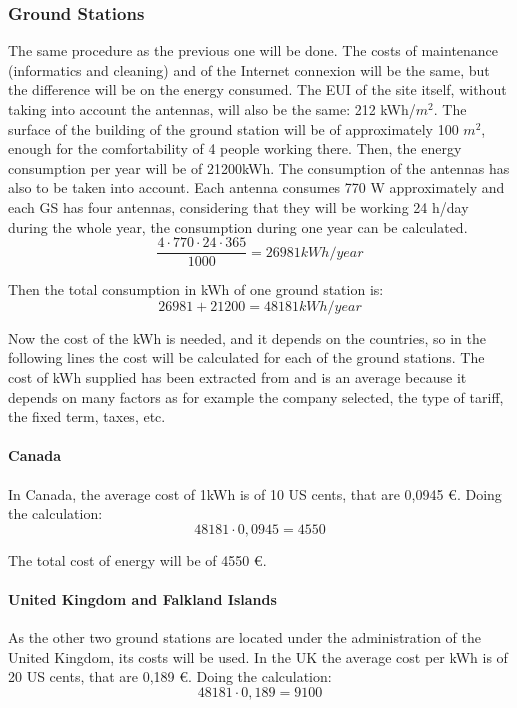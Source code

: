 \subsubsection{Ground Stations}
The same procedure as the previous one will be done. The costs of maintenance (informatics and cleaning) and of the Internet connexion will be the same, but the difference will be on the energy consumed. The EUI of the site itself, without taking into account the antennas, will also be the same: 212 kWh/$m^2$. The surface of the building of the ground station will be of approximately 100 $m^2$, enough for the comfortability of 4 people working there. Then, the energy consumption per year will be of 21200kWh. The consumption of the antennas has also to be taken into account. Each antenna consumes 770 W approximately and each GS has four antennas, considering that they will be working 24 h/day during the whole year, the consumption during one year can be calculated.
\begin{equation}
\frac{4 \cdot 770 \cdot 24 \cdot 365}{1000}=26981 kWh/year 
\end{equation}

Then the total consumption in kWh of one ground station is:
\begin{equation}
26981+21200=48181 kWh/year
\end{equation}

Now the cost of the kWh is needed, and it depends on the countries, so in the following lines the cost will be calculated for each of the ground stations. The cost of kWh supplied has been extracted from \cite{OVO} and is an average because it depends on many factors as for example the company selected, the type of tariff, the fixed term, taxes, etc.
 
\paragraph{Canada}
In Canada, the average cost of 1kWh is of 10 US cents, that are 0,0945 \euro. Doing the calculation:
\begin{equation}
48181\cdot 0,0945= 4550
\end{equation}

The total cost of energy will be of 4550 \euro.

\paragraph{United Kingdom and Falkland Islands}
As the other two ground stations are located under the administration of the United Kingdom, its costs will be used. In the UK the average cost per kWh is of 20 US cents, that are 0,189 \euro. Doing the calculation: 
\begin{equation}
48181\cdot 0,189= 9100
\end{equation}

